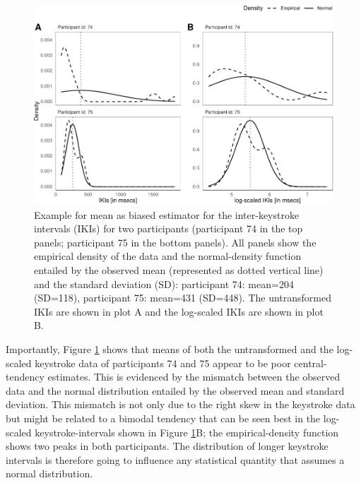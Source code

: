 \documentclass[
  english,
  man,mask,floatsintext]{apa7}
\begin{document}
\begin{figure}[bp!]

{\centering \includegraphics{report_files/figure-latex/example-1} 

}

\caption{Example for mean as biased estimator for the inter-keystroke intervals (IKIs) for two participants (participant 74 in the top panels; participant 75 in the bottom panels). All panels show the empirical density of the data and the normal-density function entailed by the observed mean (represented as dotted vertical line) and the standard deviation (SD): participant 74: mean=204 (SD=118), participant 75: mean=431 (SD=448). The untransformed IKIs are shown in plot A and the log-scaled IKIs are shown in plot B.}\label{fig:example}
\end{figure}

Importantly, Figure \ref{fig:example} shows that means of both the untransformed and the log-scaled keystroke data of participants 74 and 75 appear to be poor central-tendency estimates. This is evidenced by the mismatch between the observed data and the normal distribution entailed by the observed mean and standard deviation. This mismatch is not only due to the right skew in the keystroke data but might be related to a bimodal tendency that can be seen best in the log-scaled keystroke-intervals shown in Figure \ref{fig:example}B; the empirical-density function shows two peaks in both participants. The distribution of longer keystroke intervals is therefore going to influence any statistical quantity that assumes a normal distribution.
\end{document}
